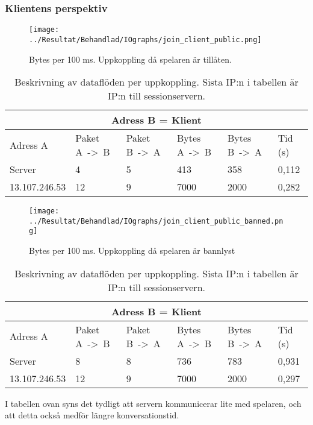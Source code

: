 \documentclass[journal,comsoc]{IEEEtran}
\begin{document}
\subsubsection{Klientens perspektiv}
\begin{figure} [H]
  \centering
  \texttt{[image: ../Resultat/Behandlad/IOgraphs/join\_client\_public.png]}
  \caption{Bytes per 100 ms. Uppkoppling då spelaren är tillåten.}
  \label{fig:client:externconn:whitelist}
\end{figure}
\begin{table} [H]
  \begin{center}
    \label{table:client:externconn:whitelist}
    \begin{tabular}{ | m{1.5cm} |  m{1cm} | m{1cm}| m{1cm}|m{1cm}|m{0.5cm}| } 
      \hline
      \multicolumn{6}{|c|}{Adress B = Klient} \\
      \hline
      Adress A & Paket A~->~B & Paket B~->~A & Bytes A~->~B & Bytes B~->~A & Tid (s) \\
      \hline
      Server & 4 & 5 & 413 & 358 & 0,112 \\
      \hline   
      13.107.246.53 & 12 & 9 & 7000 & 2000 & 0,282 \\
      \hline 
    \end{tabular}
  \end{center}
  \caption{Beskrivning av dataflöden per uppkoppling. Sista IP:n i tabellen är IP:n till sessionservern.}
\end{table}
\begin{figure} [H]
  \centering
  \texttt{[image: ../Resultat/Behandlad/IOgraphs/join\_client\_public\_banned.png]}
  \caption{Bytes per 100 ms. Uppkoppling då spelaren är bannlyst}
  \label{fig:client:externconn:banned}
\end{figure}
\begin{table} [H]
  \begin{center}
    \label{table:client:externconn:banned}
    \begin{tabular}{ | m{1.5cm} |  m{1cm} | m{1cm}| m{1cm}|m{1cm}|m{0.5cm}| } 
      \hline
      \multicolumn{6}{|c|}{Adress B = Klient} \\
      \hline
      Adress A & Paket A~->~B & Paket B~->~A & Bytes A~->~B & Bytes B~->~A & Tid (s) \\
      \hline
      Server & 8 & 8 & 736 & 783 & 0,931 \\
      \hline   
      13.107.246.53 & 12 & 9 & 7000 & 2000 & 0,297 \\
      \hline 
    \end{tabular}
  \end{center}
  \caption{Beskrivning av dataflöden per uppkoppling. Sista IP:n i tabellen är IP:n till sessionservern.}
\end{table}
I tabellen ovan syns det tydligt att servern kommunicerar lite med spelaren, och att detta också medför längre konversationstid.
\end{document}
